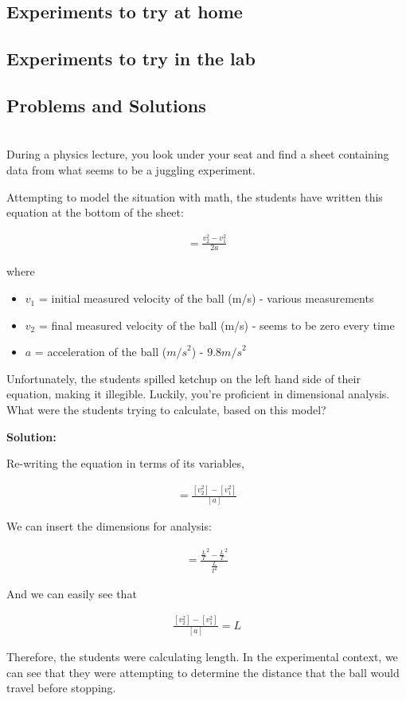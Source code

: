 \subsection{Experiments to try at home}

\subsection{Experiments to try in the lab}

\subsection{Problems and Solutions}
 \vspace{0.25cm}
\begin{problem}\\ During a physics lecture, you look under your seat and find a sheet containing data from what seems to be a juggling experiment.

Attempting to model the situation with math, the students have written this equation at the bottom of the sheet: 

\begin{align*}
=\frac{v_2^{2}-v_1^{2}}{2a}
\end{align*}

where 
\begin{itemize}
\item $v_1$ = initial measured velocity of the ball (m/s) - various measurements
\item $v_2$ = final measured velocity of the ball (m/s) - seems to be zero every time 
\item $a$ = acceleration of the ball (${m/s}^{2}$) - $9.8 {m/s}^{2}$
\end{itemize}

Unfortunately, the students spilled ketchup on the left hand side of their equation, making it illegible. Luckily, you're proficient in dimensional analysis. What were the students trying to calculate, based on this model?

\textbf{Solution:}

Re-writing the equation in terms of its variables,

\begin{align*}
=\frac{[v_2^{2}]-[v_1^{2}]}{[a]}
\end{align*}

We can insert the dimensions for analysis:

\begin{align*}
=\frac{\frac{L}{T}^{2}-\frac{L}{T}^{2}}{\frac{L}{T^{2}}}
\end{align*}

And we can easily see that 

\begin{align*}
\frac{[v_2^{2}]-[v_1^{2}]}{[a]} = L
\end{align*}

Therefore, the students were calculating length. In the experimental context, we can see that they were attempting to determine the distance that the ball would travel before stopping.\end{problem}

